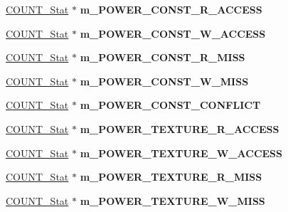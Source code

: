 \begin{DoxyCompactItemize}
\item 
\hypertarget{classall__stats__c_ab4707e7242e4e8cbcb2c78c87a072c3c}{
\hyperlink{classCOUNT__Stat}{COUNT\_\-Stat} $\ast$ {\bfseries m\_\-POWER\_\-CONST\_\-R\_\-ACCESS}}
\label{classall__stats__c_ab4707e7242e4e8cbcb2c78c87a072c3c}

\item 
\hypertarget{classall__stats__c_a1bd48df20e2921baa4e20d865684f929}{
\hyperlink{classCOUNT__Stat}{COUNT\_\-Stat} $\ast$ {\bfseries m\_\-POWER\_\-CONST\_\-W\_\-ACCESS}}
\label{classall__stats__c_a1bd48df20e2921baa4e20d865684f929}

\item 
\hypertarget{classall__stats__c_ae139c1db7b8f00848ce36845a3ff5c22}{
\hyperlink{classCOUNT__Stat}{COUNT\_\-Stat} $\ast$ {\bfseries m\_\-POWER\_\-CONST\_\-R\_\-MISS}}
\label{classall__stats__c_ae139c1db7b8f00848ce36845a3ff5c22}

\item 
\hypertarget{classall__stats__c_a014777ec0aaf016852790c2846381c1b}{
\hyperlink{classCOUNT__Stat}{COUNT\_\-Stat} $\ast$ {\bfseries m\_\-POWER\_\-CONST\_\-W\_\-MISS}}
\label{classall__stats__c_a014777ec0aaf016852790c2846381c1b}

\item 
\hypertarget{classall__stats__c_a5c023c17aa3ad7cfc2df73e049752277}{
\hyperlink{classCOUNT__Stat}{COUNT\_\-Stat} $\ast$ {\bfseries m\_\-POWER\_\-CONST\_\-CONFLICT}}
\label{classall__stats__c_a5c023c17aa3ad7cfc2df73e049752277}

\item 
\hypertarget{classall__stats__c_a89b7d5db3dbfb3329e40b2de76239e85}{
\hyperlink{classCOUNT__Stat}{COUNT\_\-Stat} $\ast$ {\bfseries m\_\-POWER\_\-TEXTURE\_\-R\_\-ACCESS}}
\label{classall__stats__c_a89b7d5db3dbfb3329e40b2de76239e85}

\item 
\hypertarget{classall__stats__c_a91221976c419aa55ab631b644f45e04a}{
\hyperlink{classCOUNT__Stat}{COUNT\_\-Stat} $\ast$ {\bfseries m\_\-POWER\_\-TEXTURE\_\-W\_\-ACCESS}}
\label{classall__stats__c_a91221976c419aa55ab631b644f45e04a}

\item 
\hypertarget{classall__stats__c_a0d0f6f18e13b2fbc0e03467029ab73be}{
\hyperlink{classCOUNT__Stat}{COUNT\_\-Stat} $\ast$ {\bfseries m\_\-POWER\_\-TEXTURE\_\-R\_\-MISS}}
\label{classall__stats__c_a0d0f6f18e13b2fbc0e03467029ab73be}

\item 
\hypertarget{classall__stats__c_ad2630fdabc3356e9adb99960354bb9ee}{
\hyperlink{classCOUNT__Stat}{COUNT\_\-Stat} $\ast$ {\bfseries m\_\-POWER\_\-TEXTURE\_\-W\_\-MISS}}
\label{classall__stats__c_ad2630fdabc3356e9adb99960354bb9ee}


\end{DoxyCompactItemize}
